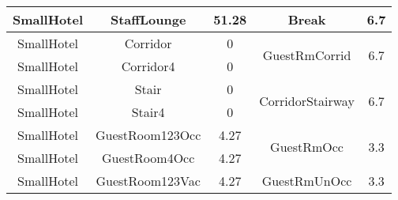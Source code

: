 \begin{table}
\begin{tabular}{|c|c|c|c|c|}
SmallHotel             & StaffLounge             & 51.28                                                                                                         & Break                             & 6.7                                                                                                            \\ \hline
SmallHotel             & Corridor                & 0                                                                                                             & \multirow{2}{*}{GuestRmCorrid}    & \multirow{2}{*}{6.7}                                                                                           \\ \cline{1-3}
SmallHotel             & Corridor4               & 0                                                                                                             &                                   &                                                                                                                \\ \hline
SmallHotel             & Stair                   & 0                                                                                                             & \multirow{2}{*}{CorridorStairway} & \multirow{2}{*}{6.7}                                                                                           \\ \cline{1-3}
SmallHotel             & Stair4                  & 0                                                                                                             &                                   &                                                                                                                \\ \hline
SmallHotel             & GuestRoom123Occ         & 4.27                                                                                                          & \multirow{2}{*}{GuestRmOcc}       & \multirow{2}{*}{3.3}                                                                                           \\ \cline{1-3}
SmallHotel             & GuestRoom4Occ           & 4.27                                                                                                          &                                   &                                                                                                                \\ \hline
SmallHotel             & GuestRoom123Vac         & 4.27                                                                                                          & \multirow{2}{*}{GuestRmUnOcc}     & \multirow{2}{*}{3.3}                                                                                           \\ \cline{1-3}

\end{tabular}
\end{table}
